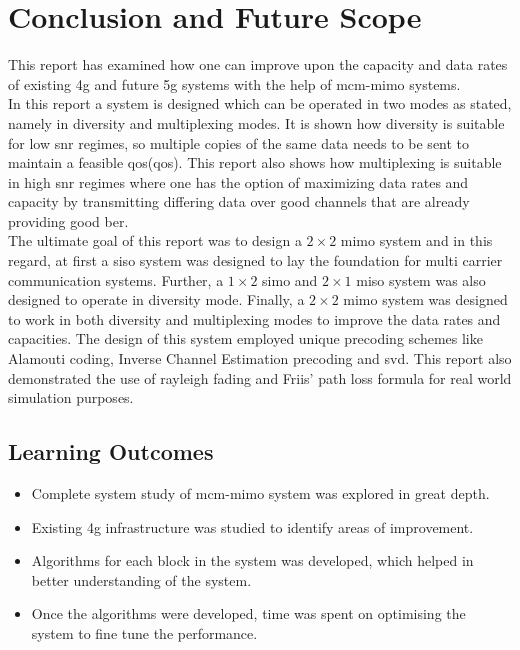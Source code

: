 \chapter{Conclusion and Future Scope}
This report has examined how one can improve upon the capacity and data rates of existing \acrshort{4g} and future \acrshort{5g} systems with the help of \acrshort{mcm}-\acrshort{mimo} systems.\\

In this report a system is designed which can be operated in two modes as stated, namely in diversity and multiplexing modes. It is shown how diversity is suitable for low \acrshort{snr} regimes, so multiple copies of the same data needs to be sent to maintain a feasible \acrlong{qos}(\acrshort{qos}). This report also shows how multiplexing is suitable in high \acrshort{snr} regimes where one has the option of maximizing data rates and capacity by transmitting differing data over good channels that are already providing good \acrshort{ber}.\\


The ultimate goal of this report was to design a $2 \times 2$ \acrshort{mimo} system and in this regard, at first a \acrshort{siso} system was designed to lay the foundation for multi carrier communication systems. Further, a $1 \times 2$ \acrshort{simo} and $2 \times 1$ \acrshort{miso} system was also designed to operate in diversity mode. Finally, a $2 \times 2$ \acrshort{mimo} system was designed to work in both diversity and multiplexing modes to improve the data rates and capacities. The design of this system employed unique precoding schemes like Alamouti coding, Inverse Channel Estimation precoding and \acrshort{svd}. This report also demonstrated the use of \gls{rayleigh fading} and Friis' path loss formula for real world simulation purposes.

\section{Learning Outcomes}
\begin{itemize}
\item Complete system study of \acrshort{mcm}-\acrshort{mimo} system was explored in great depth.
\item Existing \acrshort{4g} infrastructure was studied to identify areas of improvement.
\item Algorithms for each block in the system was developed, which helped in better understanding of the system.
\item Once the algorithms were developed, time was spent on optimising the system to fine tune the performance.
\end{itemize}

